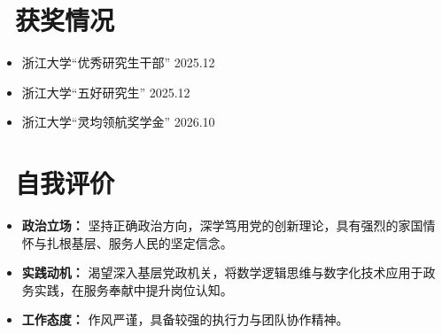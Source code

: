 \documentclass[11pt]{article}
\begin{document}
\section{\makebox[\widthof{\faGraduationCap}][c]{\color{CVBlue}\faList}\ 获奖情况}
\begin{itemize}
    \item 浙江大学“优秀研究生干部” \hfill 2025.12
    \item 浙江大学“五好研究生” \hfill 2025.12
    \item 浙江大学“灵均领航奖学金” \hfill 2026.10
\end{itemize}
    
\section{\makebox[\widthof{\faInfo}][c]{\color{CVBlue}\faInfo}\ 自我评价}
\begin{itemize}[parsep=0.5ex]
    \item \textbf{政治立场：} 坚持正确政治方向，深学笃用党的创新理论，具有强烈的家国情怀与扎根基层、服务人民的坚定信念。
    \item \textbf{实践动机：} 渴望深入基层党政机关，将数学逻辑思维与数字化技术应用于政务实践，在服务奉献中提升岗位认知。
    \item \textbf{工作态度：} 作风严谨，具备较强的执行力与团队协作精神。
\end{itemize}
\end{document}

